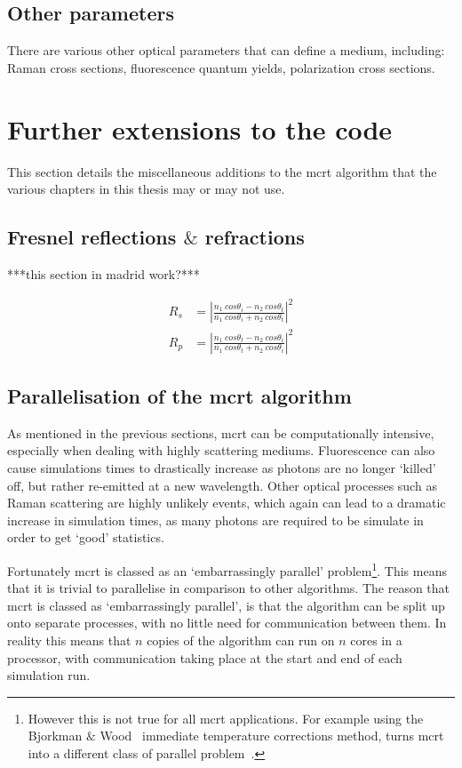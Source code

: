 \subsection{Other parameters}\label{sec:other}
There are various other optical parameters that can define a medium, including: Raman cross sections, fluorescence quantum yields, polarization cross sections.


\section{Further extensions to the code}\label{sec:codefurther}
This section details the miscellaneous additions to the \gls{mcrt} algorithm that the various chapters in this thesis may or may not use.

\subsection{Fresnel reflections \texorpdfstring{$\&$}{and} refractions}\label{sec:fresnel}
***this section in madrid work?***


\begin{align}
	R_s&=\left|\frac{n_1\ cos\theta_i-n_2\ cos\theta_t}{n_1\ cos\theta_i+n_2\ cos\theta_t}\right|^2\\
	R_p&=\left|\frac{n_1\ cos\theta_t-n_2\ cos\theta_i}{n_1\ cos\theta_t+n_2\ cos\theta_i}\right|^2
\end{align}

\subsection{Parallelisation of the \texorpdfstring{\gls{mcrt}}{MCRT} algorithm}\label{sec:parasec}

As mentioned in the previous sections, \gls{mcrt} can be computationally intensive, especially when dealing with highly scattering mediums. Fluorescence can also cause simulations times to drastically increase as photons are no longer `killed' off, but rather re-emitted at a new wavelength. Other optical processes such as Raman scattering are highly unlikely events, which again can lead to a dramatic increase in simulation times, as many photons are required to be simulate in order to get `good' statistics.

Fortunately \gls{mcrt} is classed as an `embarrassingly parallel' problem\footnote{However this is not true for all \gls{mcrt} applications. For example using the Bjorkman $\&$ Wood~\cite{bjorkman2001radiative} immediate temperature corrections method, turns \gls{mcrt} into a different class of parallel problem~\cite{robitaille2011hyperion}.}. This means that it is trivial to parallelise in comparison to other algorithms. The reason that \gls{mcrt} is classed as `embarrassingly parallel', is that the algorithm can be split up onto separate processes, with no little need for communication between them. In reality this means that $n$ copies of the algorithm can run on $n$ cores in a processor, with communication taking place at the start and end of each simulation run. 

